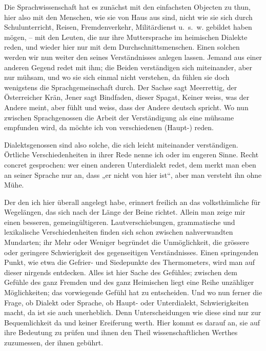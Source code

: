 \largerpage[-1]Die Sprachwissenschaft hat es zunächst mit den einfachsten Objecten zu thun, hier also mit den Menschen, wie sie von Haus aus sind, nicht wie sie sich durch Schulunterricht, Reisen, Fremdenverkehr, Militärdienst u.~s.~w. gebildet haben mögen, – mit den Leuten, die nur ihre Muttersprache im heimischen Dialekte reden, und wieder hier nur mit dem Durchschnittsmenschen. Einen solchen werden wir nun weiter den  seines Verständnisses anlegen lassen. Jemand aus einer anderen Gegend redet mit ihm; die Beiden verständigen sich miteinander, \label{fp.58} aber nur mühsam, und wo sie sich einmal nicht verstehen, da fühlen sie doch wenigstens die Sprachgemeinschaft durch. Der Sachse sagt Meerrettig, der Österreicher Krän, Jener sagt Bindfaden, dieser Spagat, Keiner weiss, was der Andere meint, aber  fühlt und weiss, dass der Andere deutsch spricht. Wo nun zwischen Sprachgenossen die Arbeit der Verständigung als eine mühsame empfunden wird, da möchte ich von verschiedenen (Haupt-)  reden.

Dialektsgenossen sind also solche, die sich leicht miteinander verständigen. Örtliche Verschiedenheiten in ihrer Rede nenne ich  oder  im engeren Sinne. Recht concret gesprochen: wer einen anderen Unterdialekt redet, dem merkt man eben an seiner Sprache nur an, dass „er nicht von hier ist“, aber man versteht ihn ohne Mühe.

Der  den ich hier überall angelegt habe, erinnert freilich an das volks\-thümliche  für Wegelängen, das sich nach der Länge der Beine richtet. Allein man zeige mir einen besseren, gemeingültigeren. Lautverschiebungen, grammatische und lexikalische Verschiedenheiten finden sich schon zwischen nahverwandten Mundarten; ihr Mehr oder Weniger begründet die Unmöglichkeit, die grössere oder geringere Schwierigkeit des gegenseitigen Verständnisses. Einen springenden Punkt, wie etwa die Gefrier- und Siedepunkte des Thermometers, wird man auf dieser  nirgends entdecken. Alles ist hier Sache des Gefühles; zwischen dem Gefühle des ganz Fremden und des ganz Heimischen liegt eine Reihe unzähliger Möglichkeiten; das vorwiegende Gefühl hat zu entscheiden. Und wo nun ferner die Frage, ob Dialekt oder Sprache, ob Haupt- oder Unterdialekt, Schwierigkeiten macht, da ist sie auch unerheblich. Denn Unterscheidungen wie diese sind nur zur Bequemlichkeit da \label{sp.58} und keiner Ereiferung werth. Hier kommt es darauf an, sie auf ihre Bedeutung  zu prüfen und ihnen den Theil wissenschaftlichen Werthes zuzumessen, der ihnen gebührt.

